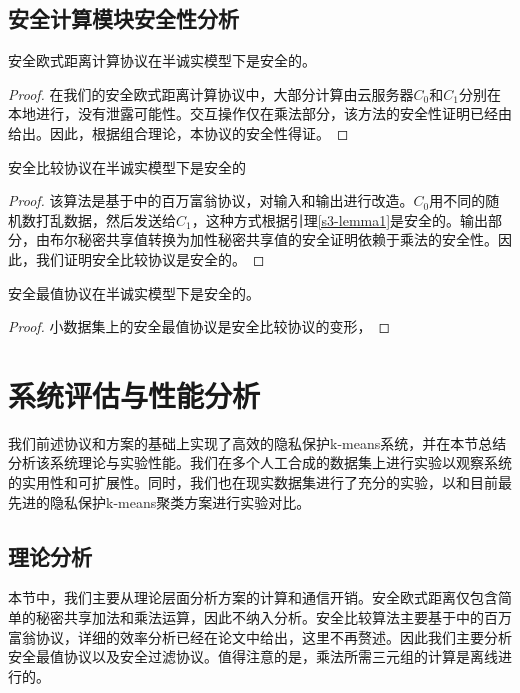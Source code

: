 \subsection{安全计算模块安全性分析}
\begin{theorem}
	安全欧式距离计算协议在半诚实模型下是安全的。
\end{theorem}
\begin{proof}
	在我们的安全欧式距离计算协议中，大部分计算由云服务器$ C_0 $和$ C_1 $分别在本地进行，没有泄露可能性。交互操作仅在乘法部分，该方法的安全性证明已经由\cite{beaver1992efficient}给出。因此，根据组合理论，本协议的安全性得证。
\end{proof}

\begin{theorem}
	安全比较协议在半诚实模型下是安全的
\end{theorem}
\begin{proof}
	该算法是基于\cite{rathee2020cryptflow2}中的百万富翁协议，对输入和输出进行改造。$ C_0 $用不同的随机数打乱数据，然后发送给$ C_1 $，这种方式根据引理\ref{s3-lemma1}是安全的。输出部分，由布尔秘密共享值转换为加性秘密共享值的安全证明依赖于乘法的安全性。因此，我们证明安全比较协议是安全的。
\end{proof}
\begin{theorem}
	安全最值协议在半诚实模型下是安全的。
\end{theorem}
\begin{proof}
	小数据集上的安全最值协议是安全比较协议的变形，
\end{proof}
\section{系统评估与性能分析}
\label{s3-shiyan}
我们前述协议和方案的基础上实现了高效的隐私保护k-means系统，并在本节总结分析该系统理论与实验性能。我们在多个人工合成的数据集上进行实验以观察系统的实用性和可扩展性。同时，我们也在现实数据集进行了充分的实验，以和目前最先进的隐私保护k-means聚类方案\cite{wu2020secure}\cite{mohassel2019practical}进行实验对比。
\subsection{理论分析}
本节中，我们主要从理论层面分析方案的计算和通信开销。安全欧式距离仅包含简单的秘密共享加法和乘法运算，因此不纳入分析。安全比较算法主要基于\cite{rathee2020cryptflow2}中的百万富翁协议，详细的效率分析已经在论文中给出，这里不再赘述。因此我们主要分析安全最值协议以及安全过滤协议。值得注意的是，乘法所需三元组的计算是离线进行的。
